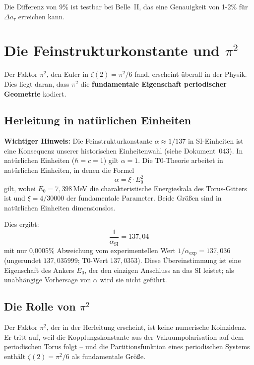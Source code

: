 	Die Differenz von 9\% ist testbar bei Belle~II, das eine Genauigkeit von 1-2\% für $\Delta a_\tau$ erreichen kann.
	
	
	\section{Die Feinstrukturkonstante und $\pi^2$}
	
	Der Faktor $\pi^2$, den Euler in $\zeta(2) = \pi^2/6$ fand, erscheint überall in der Physik. Dies liegt daran, dass $\pi^2$ die \textbf{fundamentale Eigenschaft periodischer Geometrie} kodiert.
	
	\subsection{Herleitung in natürlichen Einheiten}
	
	\textbf{Wichtiger Hinweis:} Die Feinstrukturkonstante $\alpha \approx 1/137$ in SI-Einheiten ist eine Konsequenz unserer historischen Einheitenwahl (siehe Dokument~043). In natürlichen Einheiten ($\hbar = c = 1$) gilt $\alpha = 1$. Die T0-Theorie arbeitet in natürlichen Einheiten, in denen die Formel
	\begin{equation}
		\alpha = \xi \cdot E_0^2
		\label{eq:alpha-derivation}
	\end{equation}
	gilt, wobei $E_0 = 7{,}398$\,MeV die charakteristische Energieskala des Torus-Gitters ist und $\xi = 4/30000$ der fundamentale Parameter. Beide Größen sind in natürlichen Einheiten dimensionslos.
	
	Dies ergibt:
	\begin{equation}
		\frac{1}{\alpha_\text{SI}} = 137{,}04
	\end{equation}
	mit nur 0{,}0005\% Abweichung vom experimentellen Wert $1/\alpha_\text{exp} = 137{,}036$ (ungerundet $137{,}035999$; T0-Wert $137{,}0353$). Diese Übereinstimmung ist eine Eigenschaft des Ankers $E_0$, der den einzigen Anschluss an das SI leistet; als unabhängige Vorhersage von $\alpha$ wird sie nicht geführt.
	
	\subsection{Die Rolle von $\pi^2$}
	
	Der Faktor $\pi^2$, der in der Herleitung erscheint, ist keine numerische Koinzidenz. Er tritt auf, weil die Kopplungskonstante aus der Vakuumpolarisation auf dem periodischen Torus folgt -- und die Partitionsfunktion eines periodischen Systems enthält $\zeta(2) = \pi^2/6$ als fundamentale Größe.
	
